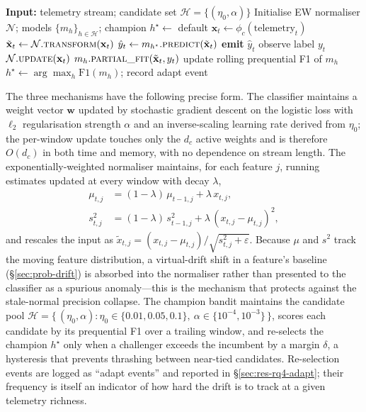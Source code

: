 \documentclass[acmsmall]{acmart}
\begin{document}
\begin{algorithm}[t]
\caption{Online-adaptive prequential detection}\label{alg:online}
\begin{algorithmic}[1]
\State \textbf{Input:} telemetry stream; candidate set $\mathcal{H}=\{(\eta_0,\alpha)\}$
\State Initialise EW normaliser $\mathcal{N}$; models $\{m_h\}_{h\in\mathcal{H}}$; champion $h^\star \gets$ default
  \State $\mathbf{x}_t \gets \phi_c(\text{telemetry}_t)$ 
  \State $\tilde{\mathbf{x}}_t \gets \mathcal{N}.\textsc{transform}(\mathbf{x}_t)$ 
  \State $\hat{y}_t \gets m_{h^\star}.\textsc{predict}(\tilde{\mathbf{x}}_t)$ 
  \State \textbf{emit} $\hat{y}_t$
  \State observe label $y_t$
  \State $\mathcal{N}.\textsc{update}(\mathbf{x}_t)$
   
     \State $m_h.\textsc{partial\_fit}(\tilde{\mathbf{x}}_t, y_t)$
     \State update rolling prequential F1 of $m_h$
  \EndFor
   
     \State $h^\star \gets \arg\max_h \text{F1}(m_h)$; record adapt event
  \EndIf
\EndFor
\end{algorithmic}
\end{algorithm}

The three mechanisms have the following precise form. The classifier maintains a weight vector $\mathbf{w}$ updated by stochastic gradient descent on the logistic loss with $\ell_2$ regularisation strength $\alpha$ and an inverse-scaling learning rate derived from $\eta_0$; the per-window update touches only the $d_c$ active weights and is therefore $O(d_c)$ in both time and memory, with no dependence on stream length. The exponentially-weighted normaliser maintains, for each feature $j$, running estimates updated at every window with decay $\lambda$,
\begin{align}
  \mu_{t,j} &= (1-\lambda)\,\mu_{t-1,j} + \lambda\, x_{t,j}, \\
  s^2_{t,j} &= (1-\lambda)\,s^2_{t-1,j} + \lambda\,(x_{t,j}-\mu_{t,j})^2,
\end{align}
and rescales the input as $\tilde{x}_{t,j} = (x_{t,j}-\mu_{t,j})/\sqrt{s^2_{t,j}+\varepsilon}$. Because $\mu$ and $s^2$ track the moving feature distribution, a virtual-drift shift in a feature's baseline (\S\ref{sec:prob-drift}) is absorbed into the normaliser rather than presented to the classifier as a spurious anomaly---this is the mechanism that protects against the stale-normal precision collapse. The champion bandit maintains the candidate pool $\mathcal{H} = \{\,(\eta_0,\alpha) : \eta_0 \in \{0.01,0.05,0.1\},\ \alpha \in \{10^{-4},10^{-3}\}\,\}$, scores each candidate by its prequential F1 over a trailing window, and re-selects the champion $h^\star$ only when a challenger exceeds the incumbent by a margin $\delta$, a hysteresis that prevents thrashing between near-tied candidates. Re-selection events are logged as ``adapt events'' and reported in \S\ref{sec:res-rq4-adapt}; their frequency is itself an indicator of how hard the drift is to track at a given telemetry richness.
\end{document}
